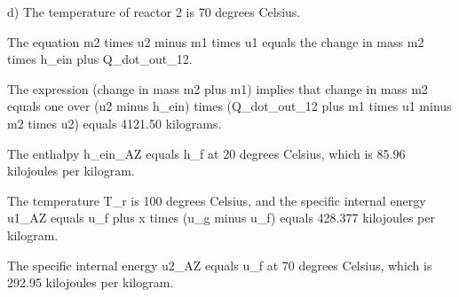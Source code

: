 d) The temperature of reactor 2 is 70 degrees Celsius.

The equation m2 times u2 minus m1 times u1 equals the change in mass m2 times h_ein plus Q_dot_out_12.

The expression (change in mass m2 plus m1) implies that change in mass m2 equals one over (u2 minus h_ein) times (Q_dot_out_12 plus m1 times u1 minus m2 times u2) equals 4121.50 kilograms.

The enthalpy h_ein_AZ equals h_f at 20 degrees Celsius, which is 85.96 kilojoules per kilogram.

The temperature T_r is 100 degrees Celsius, and the specific internal energy u1_AZ equals u_f plus x times (u_g minus u_f) equals 428.377 kilojoules per kilogram.

The specific internal energy u2_AZ equals u_f at 70 degrees Celsius, which is 292.95 kilojoules per kilogram.